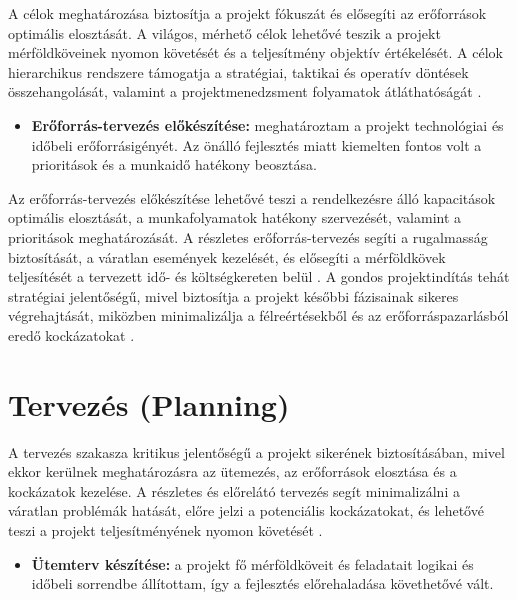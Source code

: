 A célok meghatározása biztosítja a projekt fókuszát és elősegíti az erőforrások optimális elosztását. 
A világos, mérhető célok lehetővé teszik a projekt mérföldköveinek nyomon követését és a teljesítmény objektív értékelését. 
A célok hierarchikus rendszere támogatja a stratégiai, taktikai és operatív döntések összehangolását, valamint a projektmenedzsment folyamatok átláthatóságát \cite{Hajdu2014,Szalay2018}.

\begin{itemize}
    \item \textbf{Erőforrás-tervezés előkészítése:} meghatároztam a projekt technológiai és időbeli erőforrásigényét. 
    Az önálló fejlesztés miatt kiemelten fontos volt a prioritások és a munkaidő hatékony beosztása.
\end{itemize}

Az erőforrás-tervezés előkészítése lehetővé teszi a rendelkezésre álló kapacitások optimális elosztását, 
a munkafolyamatok hatékony szervezését, valamint a prioritások meghatározását. 
A részletes erőforrás-tervezés segíti a rugalmasság biztosítását, a váratlan események kezelését, 
és elősegíti a mérföldkövek teljesítését a tervezett idő- és költségkereten belül \cite{Kovacs2016,Kaposi2019,Hajdu2014}.
A gondos projektindítás tehát stratégiai jelentőségű, mivel biztosítja a projekt későbbi fázisainak sikeres végrehajtását, 
miközben minimalizálja a félreértésekből és az erőforráspazarlásból eredő kockázatokat \cite{Szalay2018}.


\section{Tervezés (Planning)}

A tervezés szakasza kritikus jelentőségű a projekt sikerének biztosításában, mivel ekkor kerülnek meghatározásra az ütemezés, az erőforrások elosztása és a kockázatok kezelése. 
A részletes és előrelátó tervezés segít minimalizálni a váratlan problémák hatását, előre jelzi a potenciális kockázatokat, 
és lehetővé teszi a projekt teljesítményének nyomon követését \cite{Hajdu2014,Szalay2018,Kovacs2016,Kaposi2019}.

\begin{itemize}
    \item \textbf{Ütemterv készítése:} a projekt fő mérföldköveit és feladatait logikai és időbeli sorrendbe állítottam, így a fejlesztés előrehaladása követhetővé vált.
\end{itemize}

